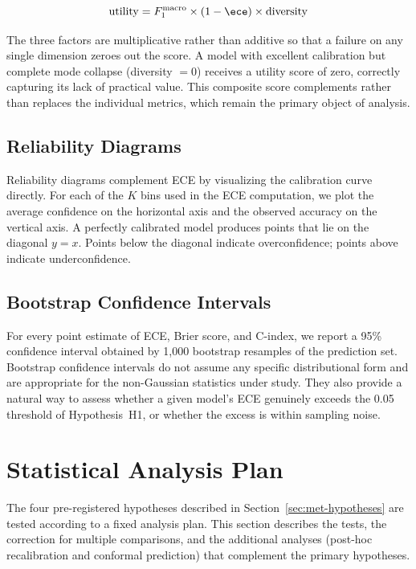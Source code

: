 \begin{equation}
    \operatorname{utility} = F_1^{\text{macro}} \times (1 - \ece) \times 
    \operatorname{diversity}
    \label{eq:composite}
\end{equation}

The three factors are multiplicative rather than additive so that a 
failure on any single dimension zeroes out the score. A model with 
excellent calibration but complete mode collapse (diversity $= 0$) 
receives a utility score of zero, correctly capturing its lack of 
practical value. This composite score complements rather than replaces 
the individual metrics, which remain the primary object of analysis.

\subsection{Reliability Diagrams}
\label{subsec:met-reliab}

Reliability diagrams complement ECE by visualizing the calibration curve 
directly. For each of the $K$ bins used in the ECE computation, we plot 
the average confidence on the horizontal axis and the observed accuracy 
on the vertical axis. A perfectly calibrated model produces points that 
lie on the diagonal $y = x$. Points below the diagonal indicate 
overconfidence; points above indicate underconfidence.

\subsection{Bootstrap Confidence Intervals}
\label{subsec:met-bootstrap}

For every point estimate of ECE, Brier score, and C-index, we report a 
95\% confidence interval obtained by 1{,}000 bootstrap resamples of the 
prediction set. Bootstrap confidence intervals do not assume any specific 
distributional form and are appropriate for the non-Gaussian statistics 
under study. They also provide a natural way to assess whether a given 
model's ECE genuinely exceeds the 0.05 threshold of Hypothesis~H1, or 
whether the excess is within sampling noise.

\section{Statistical Analysis Plan}
\label{sec:met-stats}

The four pre-registered hypotheses described in 
Section~\ref{sec:met-hypotheses} are tested according to a fixed analysis 
plan. This section describes the tests, the correction for multiple 
comparisons, and the additional analyses (post-hoc recalibration and 
conformal prediction) that complement the primary hypotheses.


